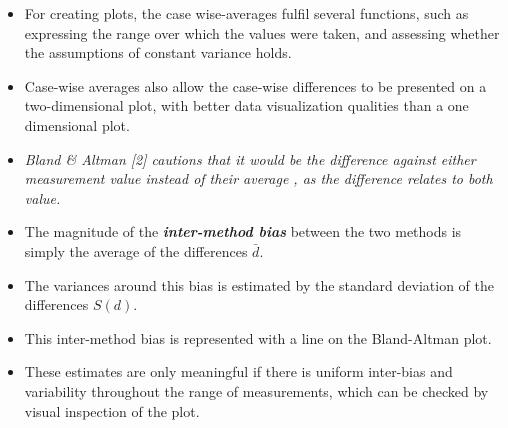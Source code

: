 \documentclass[compress]{beamer}        %
\begin{document}
%

\begin{frame}

\begin{itemize}
\item For creating plots, the case wise-averages fulfil several
functions, such as expressing the range over which the values were
taken, and assessing whether the assumptions of constant variance
holds.
\item Case-wise averages also allow the case-wise differences to
be presented on a two-dimensional plot, with better data
visualization qualities than a one dimensional plot.
\item\textit{ Bland \& Altman [2]
cautions that it would be the difference against either
measurement value instead of their average , as the difference
relates to both value.}
\end{itemize}
\end{frame}

\begin{frame}
\large
\begin{itemize}
\item The magnitude of the \textbf{\textit{inter-method bias}} between the two methods is
simply the average of the differences $\bar{d}$.
\item The variances
around this bias is estimated by the standard deviation of the
differences $S(d)$. 
\item This inter-method bias is represented with a
line on the Bland-Altman plot. 
\item These estimates are only meaningful
if there is uniform inter-bias and variability throughout the
range of measurements, which can be checked by visual inspection
of the plot.
\end{itemize}
 
\end{frame}
\end{document}
